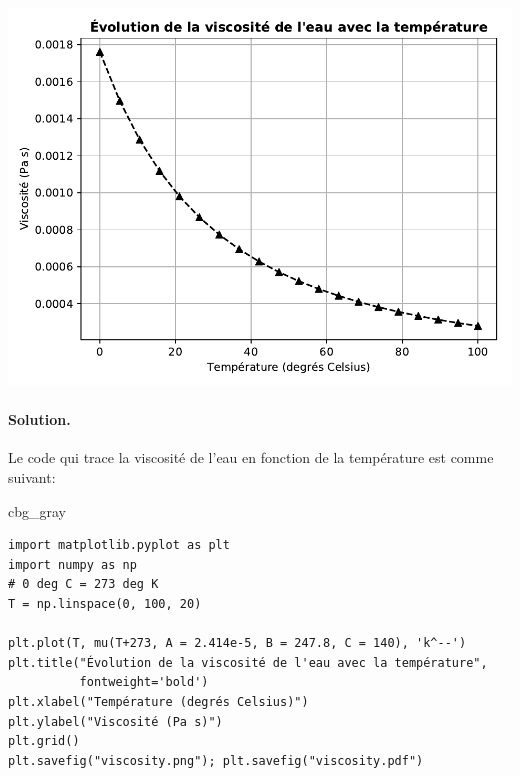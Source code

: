 \documentclass[%
oneside,                 %
final,                   %
10pt,french]{article}
\newenvironment{_cod_tight}[1]{
   \def\FrameCommand{\colorbox{#1}}
   \FrameRule0.6pt\MakeFramed {\FrameRestore}\vskip3mm}
   {\vskip0mm\endMakeFramed}
\newenvironment{cod}[1]{
\bgroup\rmfamily
\fboxsep=0mm\relax
\begin{_cod_tight}{#1}
\list{}{\parsep=-2mm\parskip=0mm\topsep=0pt\leftmargin=2mm
\rightmargin=2\leftmargin\leftmargin=4pt\relax}
\item\relax}
{\endlist\end{_cod_tight}\egroup}
\newenvironment{doconceexercise}{}{}
\begin{document}
\begin{doconceexercise}
\noindent
\vspace{6mm}

\centerline{\includegraphics[width=0.5\linewidth]{scripts/viscosity.pdf}}

\vspace{6mm}





\paragraph{Solution.}
Le code qui trace la viscosité de l'eau en fonction de la température est comme suivant:
\begin{cod}{cbg_gray}\begin{verbatim}
import matplotlib.pyplot as plt
import numpy as np
# 0 deg C = 273 deg K
T = np.linspace(0, 100, 20)

plt.plot(T, mu(T+273, A = 2.414e-5, B = 247.8, C = 140), 'k^--')
plt.title("Évolution de la viscosité de l'eau avec la température",
          fontweight='bold')
plt.xlabel("Température (degrés Celsius)")
plt.ylabel("Viscosité (Pa s)")
plt.grid()
plt.savefig("viscosity.png"); plt.savefig("viscosity.pdf")
\end{verbatim}
\end{cod}
\noindent


\end{doconceexercise}



\end{document}
